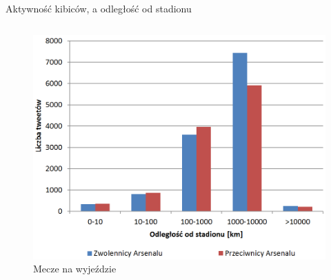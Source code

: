 \documentclass[xcolor=table]{beamer}
\begin{document}
\begin{frame}{Aktywność kibiców, a odległość od stadionu}
\begin{columns}[C]
\begin{column}{.48\textwidth}
\begin{figure}[ht!] 
\centering
\includegraphics[width=\linewidth]{img/odleglosc-od-stadionu-away.png}
\caption{Mecze na wyjeździe}
\end{figure}

\end{column}%
\end{columns}

\end{frame}
\end{document}
